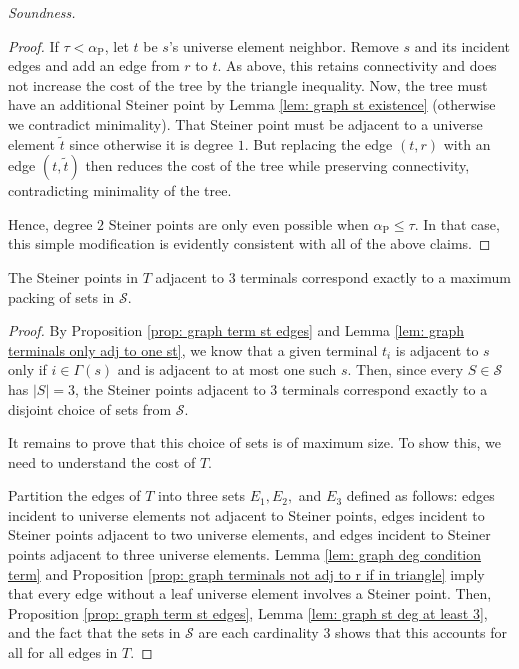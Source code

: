 \documentclass{theoretics}
\newcommand{\1}{\textbf{1}}
\newcommand{\td}{\tau}
\newcommand{\trd}{\alpha_{\text{P}}}
\renewcommand{\tilde}{\widetilde}
\begin{document}
\begin{paragraph}{\textit{Soundness.}}
\begin{proof}
If $\td < \trd$, let $t$ be $s$'s universe element neighbor. Remove $s$ and its incident edges and add an edge from $r$ to $t$. As above, this retains connectivity and does not increase the cost of the tree by the triangle inequality. Now, the tree must have an additional Steiner point by Lemma \ref{lem: graph st existence} (otherwise we contradict minimality). That Steiner point must be adjacent to a universe element $\tilde{t}$ since otherwise it is degree $1$. But replacing the edge $(t,r)$ with an edge $(t, \tilde{t})$ then reduces the cost of the tree while preserving connectivity, contradicting minimality of the tree.

Hence, degree $2$ Steiner points are only even possible when $\trd \leq \td$. In that case, this simple modification is evidently consistent with all of the above claims.
\end{proof}
 
 \begin{lemma} \label{lem: graph max packing}
The Steiner points in $T$ adjacent to $3$ terminals correspond exactly to a maximum packing of sets in $\mathcal{S}$.
 \end{lemma}
 \begin{proof}
By Proposition \ref{prop: graph term st edges} and Lemma \ref{lem: graph terminals only adj to one st}, we know that a given terminal $t_i$ is adjacent to $s$ only if $i \in \Gamma(s)$ and is adjacent to at most one such $s$. Then, since every $S \in \mathcal{S}$ has $|S| = 3$, the Steiner points adjacent to $3$ terminals correspond exactly to a disjoint choice of sets from $\mathcal{S}$.

It remains to prove that this choice of sets is of maximum size. To show this, we need to understand the cost of $T$. 

Partition the edges of $T$ into three sets $E_1, E_2,$ and $E_3$ defined as follows: edges incident to universe elements not adjacent to Steiner points, edges incident to Steiner points adjacent to two universe elements, and edges incident to Steiner points adjacent to three universe elements. 
Lemma \ref{lem: graph deg condition term} and Proposition \ref{prop: graph terminals not adj to r if in triangle} imply that every edge without a leaf universe element involves a Steiner point. Then, Proposition \ref{prop: graph term st edges}, Lemma \ref{lem: graph st deg at least 3}, and the fact that the sets in $\mathcal{S}$ are each cardinality $3$ shows that this accounts for all for all edges in $T$.



\end{proof}
\end{paragraph}
\end{document}
